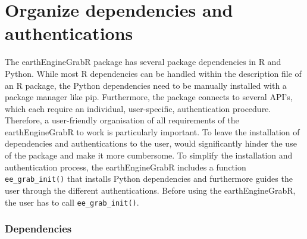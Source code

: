 \section{Organize dependencies and authentications}


The earthEngineGrabR package has several package dependencies in R and Python. While most R dependencies can be handled within the description file of an R package, the Python dependencies need to be manually installed with a package manager like pip. Furthermore, the package connects to several API's, which each require an individual, user-specific, authentication procedure. Therefore, a user-friendly organisation of all requirements of the earthEngineGrabR to work is particularly important. To leave the installation of dependencies and authentications to the user, would significantly hinder the use of the package and make it more cumbersome. To simplify the installation and authentication process, the earthEngineGrabR includes a function \texttt{ee\_grab\_init()} that installs Python dependencies and furthermore guides the user through the different authentications. Before using the earthEngineGrabR, the user has to call \texttt{ee\_grab\_init()}. 

\subsubsection{Dependencies}

